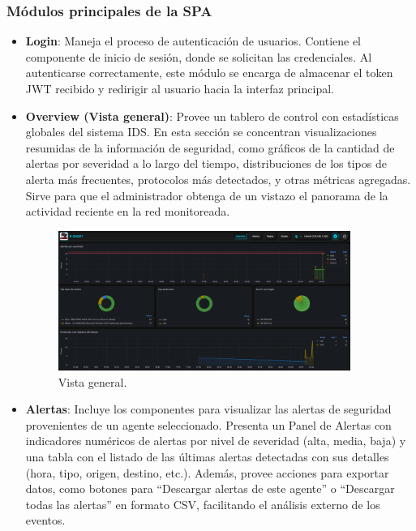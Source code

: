 \documentclass[11pt,a4paper,twoside]{report}
\begin{document}
\subsubsection*{Módulos principales de la SPA}

\begin{itemize}
	\item \textbf{Login}: Maneja el proceso de autenticación de usuarios. Contiene el componente de inicio de sesión, donde se solicitan las credenciales. Al autenticarse correctamente, este módulo se encarga de almacenar el token JWT recibido y redirigir al usuario hacia la interfaz principal.
	
	\item \textbf{Overview (Vista general)}: Provee un tablero de control con estadísticas globales del sistema IDS. En esta sección se concentran visualizaciones resumidas de la información de seguridad, como gráficos de la cantidad de alertas por severidad a lo largo del tiempo, distribuciones de los tipos de alerta más frecuentes, protocolos más detectados, y otras métricas agregadas. Sirve para que el administrador obtenga de un vistazo el panorama de la actividad reciente en la red monitoreada.

	\begin{figure}[H]
		\centering
		\includegraphics[width=0.9\textwidth]{documento/overview.png}
		\caption{Vista general.}
		\label{fig:overview-frontend}
	\end{figure}
	
	\item \textbf{Alertas}: Incluye los componentes para visualizar las alertas de seguridad provenientes de un agente seleccionado. Presenta un Panel de Alertas con indicadores numéricos de alertas por nivel de severidad (alta, media, baja) y una tabla con el listado de las últimas alertas detectadas con sus detalles (hora, tipo, origen, destino, etc.). Además, provee acciones para exportar datos, como botones para ``Descargar alertas de este agente'' o ``Descargar todas las alertas'' en formato CSV, facilitando el análisis externo de los eventos.
	

\end{itemize}
\end{document}
